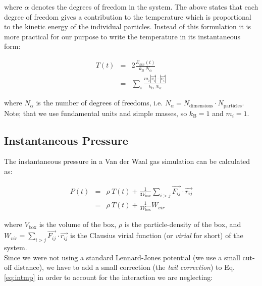 \documentclass{article}
\begin{document}
where $\alpha$ denotes the degrees of freedom in the system.
The above states that each degree of freedom gives a contribution to the temperature which is proportional to the kinetic energy of the individual particles.
Instead of this formulation it is more practical for our purpose to write the temperature in its instantaneous form:

\begin{eqnarray}
    T(t) &=& 2 \frac{E_{kin}(t)}{k_\mathrm{B} \ N_\alpha }\\
         &=& \sum_i \frac{m_i|\vec{v_i}| \cdot |\vec{v_i}|}{k_\mathrm{B} \ N_\alpha}
\end{eqnarray}

where $N_\alpha$ is the number of degrees of freedoms, i.e. $N_\alpha = N_{\mathrm{dimensions}} \cdot N_{\mathrm{particles}}$. Note; that we use fundamental units and simple masses, so $k_\mathrm{B} = 1$ and $m_i = 1$.\\

% 


\subsection{Instantaneous Pressure}

The instantaneous pressure in a Van der Waal gas simulation can be calculated as:

\begin{eqnarray}
    P(t) & = & \rho \ T(t) + \frac{1}{3V_\mathrm{box}}  \sum_{i>j} \vec{F_{ij}} \cdot \vec{r_{ij}}\\
         & = & \rho \ T(t) + \frac{1}{3V_\mathrm{box}} W_{vir} \label{eq:intmp}
\end{eqnarray}

where $V_\mathrm{box}$ is the volume of the box,
$\rho$ is the particle-density of the box, and
$W_{vir} = \sum_{i>j} \vec{F_{ij}} \cdot \vec{r_{ij}}$ is the Clausius virial function (or \textit{virial} for short) of the system.\\

Since we were not using a standard Lennard-Jones potential (we use a small cut-off distance),
we have to add a small correction (the \textit{tail correction}) to Eq. \ref{eq:intmp} in order to account for the interaction we are neglecting:
\end{document}
